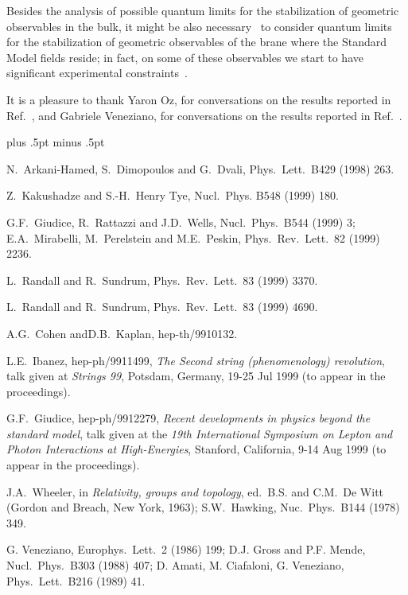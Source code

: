 Besides the analysis of 
possible quantum limits for the stabilization
of geometric observables in the bulk,
it might be also necessary~\cite{polonpap} to consider
quantum limits for the stabilization
of geometric observables 
of the brane where the Standard Model fields reside;
in fact, on some of these observables we start to have significant
experimental constraints~\cite{polonpap,gacgwi}.

\bigskip
\bigskip
\bigskip
\bigskip
It is a pleasure to thank Yaron Oz,
for conversations on the results reported in Ref.~\cite{dbrscatt},
and Gabriele Veneziano, for conversations on 
the results reported in Ref.~\cite{venekonmen}.

\baselineskip 12pt plus .5pt minus .5pt
\begin{thebibliography}{99}

N.~Arkani-Hamed, S.~Dimopoulos and G.~Dvali, 
Phys.~Lett.~B429 (1998) 263.

Z.~Kakushadze and S.-H.~Henry Tye,
Nucl.~Phys. B548 (1999) 180.

 G.F.~Giudice, R.~Rattazzi and J.D.~Wells,
Nucl.~Phys.~B544 (1999) 3; 
E.A.~Mirabelli, M.~Perelstein
and M.E.~Peskin, 
Phys.~Rev.~Lett.~82 (1999) 2236.

L.~Randall and R.~Sundrum, 
Phys.~Rev.~Lett.~83 (1999) 3370.

L.~Randall and R.~Sundrum, 
Phys.~Rev.~Lett.~83 (1999) 4690.

A.G.~Cohen andD.B.~Kaplan, 
hep-th/9910132.

L.E.~Ibanez, 
hep-ph/9911499,
{\it The Second string (phenomenology) revolution},
talk given at {\it Strings 99}, Potsdam, Germany, 19-25 Jul 1999
(to appear in the proceedings).

G.F.~Giudice, hep-ph/9912279,
{\it Recent developments in physics beyond the standard model},
talk given at the {\it 19th International Symposium on Lepton 
and Photon Interactions at High-Energies}, Stanford, California, 
9-14 Aug 1999 (to appear in the proceedings).

 J.A.~Wheeler, in {\it Relativity, groups
and topology},
ed.~B.S. and C.M.~De Witt (Gordon and Breach, New York, 1963);
S.W.~Hawking, 
Nuc.~Phys.~B144 (1978) 349.

 G. Veneziano,
Europhys.~Lett.~2 (1986) 199;
D.J. Gross and P.F. Mende, Nucl.~Phys.~B303 (1988) 407;
D. Amati, M. Ciafaloni, G. Veneziano,
Phys.~Lett.~B216 (1989) 41.


\end{thebibliography}
